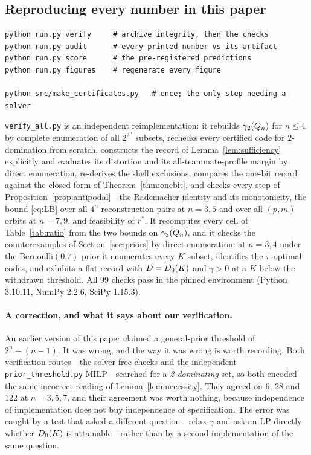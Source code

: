 \subsection{Reproducing every number in this paper}
\label{app:repro}

\begin{verbatim}
python run.py verify     # archive integrity, then the checks
python run.py audit      # every printed number vs its artifact
python run.py score      # the pre-registered predictions
python run.py figures    # regenerate every figure

python src/make_certificates.py   # once; the only step needing a solver
\end{verbatim}

\noindent
\texttt{verify\_all.py} is an independent reimplementation: it rebuilds
$\gamma_2(Q_n)$ for $n \le 4$ by complete enumeration of all $2^{2^n}$ subsets,
rechecks every certified code for $2$-domination from scratch, constructs the
record of Lemma~\ref{lem:sufficiency} explicitly and evaluates its distortion and
its all-teammate-profile margin by direct enumeration, re-derives the shell
exclusions, compares the one-bit record against the closed form of
Theorem~\ref{thm:onebit}, and checks every step of
Proposition~\ref{prop:antipodal}---the Rademacher identity and its monotonicity,
the bound \eqref{eq:LB} over all $4^n$ reconstruction pairs at $n = 3,5$ and over
all $(p,m)$ orbits at $n = 7,9$, and feasibility of $r^\ast$. It recomputes every
cell of Table~\ref{tab:ratio} from the two bounds on $\gamma_2(Q_n)$, and it checks
the counterexamples of Section~\ref{sec:priors} by direct enumeration: at
$n = 3,4$ under the Bernoulli$(0.7)$ prior it enumerates every $K$-subset,
identifies the $\pi$-optimal codes, and exhibits a flat record with
$D = D_0(K)$ and $\gamma > 0$ at a $K$ below the withdrawn threshold. All $99$ checks pass in the pinned environment (Python 3.10.11, NumPy 2.2.6, SciPy
1.15.3).

\paragraph{A correction, and what it says about our verification.}
An earlier version of this paper claimed a general-prior threshold of
$2^n - (n-1)$. It was wrong, and the way it was wrong is worth recording. Both
verification routes---the solver-free checks and the independent
\texttt{prior\_threshold.py} MILP---searched for a \emph{2-dominating} set, so
both encoded the same incorrect reading of Lemma~\ref{lem:necessity}. They
agreed on $6$, $28$ and $122$ at $n = 3,5,7$, and their agreement was worth
nothing, because independence of implementation does not buy independence of
specification. The error was caught by a test that asked a different
question---relax $\gamma$ and ask an LP directly whether $D_0(K)$ is
attainable---rather than by a second implementation of the same question.

